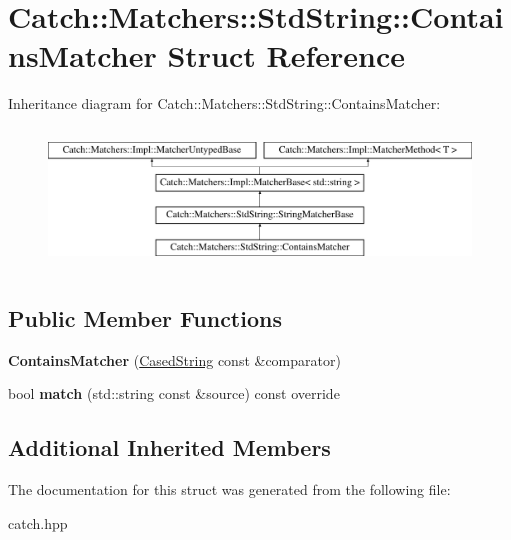\hypertarget{struct_catch_1_1_matchers_1_1_std_string_1_1_contains_matcher}{}\section{Catch\+:\+:Matchers\+:\+:Std\+String\+:\+:Contains\+Matcher Struct Reference}
\label{struct_catch_1_1_matchers_1_1_std_string_1_1_contains_matcher}
Inheritance diagram for Catch\+:\+:Matchers\+:\+:Std\+String\+:\+:Contains\+Matcher\+:\begin{figure}[H]
\begin{center}
\leavevmode
\includegraphics[height=3.758389cm]{struct_catch_1_1_matchers_1_1_std_string_1_1_contains_matcher}
\end{center}
\end{figure}
\subsection*{Public Member Functions}
\begin{DoxyCompactItemize}
\item 
\mbox{\label{struct_catch_1_1_matchers_1_1_std_string_1_1_contains_matcher_acc892883c8409e34b28c9b39d4ef1fe3}} 
{\bfseries Contains\+Matcher} (\mbox{\hyperlink{struct_catch_1_1_matchers_1_1_std_string_1_1_cased_string}{Cased\+String}} const \&comparator)
\item 
\mbox{\label{struct_catch_1_1_matchers_1_1_std_string_1_1_contains_matcher_a630628b234b037be83fe587081a80b53}} 
bool {\bfseries match} (std\+::string const \&source) const override
\end{DoxyCompactItemize}
\subsection*{Additional Inherited Members}


The documentation for this struct was generated from the following file\+:\begin{DoxyCompactItemize}
\item 
catch.\+hpp\end{DoxyCompactItemize}
